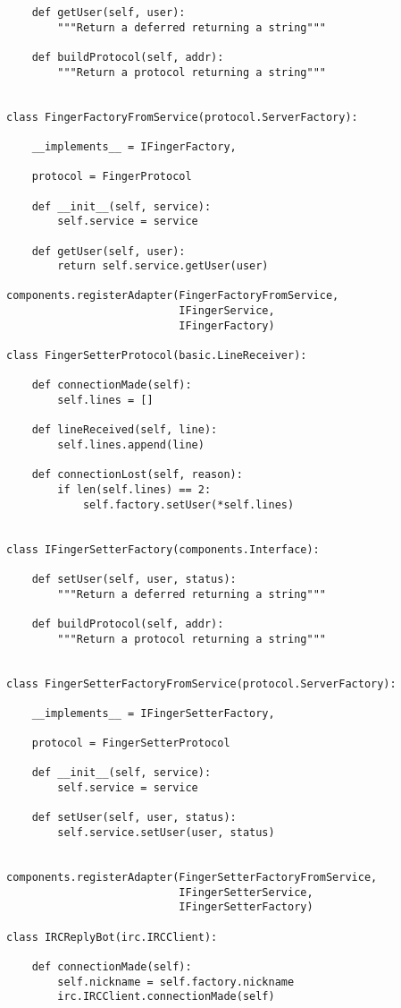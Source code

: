 \begin{verbatim}
    def getUser(self, user):
        """Return a deferred returning a string"""

    def buildProtocol(self, addr):
        """Return a protocol returning a string"""


class FingerFactoryFromService(protocol.ServerFactory):

    __implements__ = IFingerFactory,

    protocol = FingerProtocol

    def __init__(self, service):
        self.service = service

    def getUser(self, user):
        return self.service.getUser(user)

components.registerAdapter(FingerFactoryFromService,
                           IFingerService,
                           IFingerFactory)

class FingerSetterProtocol(basic.LineReceiver):

    def connectionMade(self):
        self.lines = []

    def lineReceived(self, line):
        self.lines.append(line)

    def connectionLost(self, reason):
        if len(self.lines) == 2:
            self.factory.setUser(*self.lines)


class IFingerSetterFactory(components.Interface):

    def setUser(self, user, status):
        """Return a deferred returning a string"""

    def buildProtocol(self, addr):
        """Return a protocol returning a string"""


class FingerSetterFactoryFromService(protocol.ServerFactory):

    __implements__ = IFingerSetterFactory,

    protocol = FingerSetterProtocol

    def __init__(self, service):
        self.service = service

    def setUser(self, user, status):
        self.service.setUser(user, status)


components.registerAdapter(FingerSetterFactoryFromService,
                           IFingerSetterService,
                           IFingerSetterFactory)

class IRCReplyBot(irc.IRCClient):

    def connectionMade(self):
        self.nickname = self.factory.nickname
        irc.IRCClient.connectionMade(self)


\end{verbatim}
